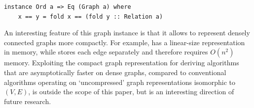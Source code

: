 \begin{verbatim}
instance Ord a => Eq (Graph a) where
    x == y = fold x == (fold y :: Relation a)
\end{verbatim}

An interesting feature of this graph instance is that it allows to represent
densely connected graphs more compactly. For example, 
has a linear-size representation in memory, while 
stores each edge separately and therefore requires $O(n^2)$ memory. Exploiting the
compact graph representation for deriving algorithms that are asymptotically faster
on dense graphs, compared to conventional algorithms operating on `uncompressed'
graph representations isomorphic to $(V,E)$, is outside the scope of this paper,
but is an interesting direction of future research.



